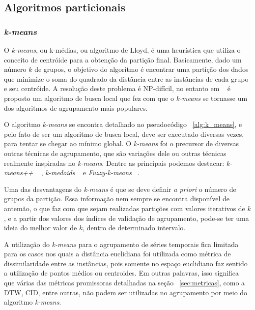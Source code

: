 \subsection{Algoritmos particionais}

\subsubsection{\emph{k-means}}

O \emph{k-means}, ou k-médias, ou algoritmo de Lloyd, é uma heurística que utiliza o conceito de centróide para a obtenção da partição final. Basicamente, dado um número $k$ de grupos, o objetivo do algoritmo é encontrar uma partição dos dados que minimize o soma do quadrado da distância entre as instâncias de cada grupo e seu centróide. A resolução deste problema é NP-difícil, no entanto em ~\parencite{Lloyd} é proposto um algoritmo de busca local que fez com que o \emph{k-means} se tornasse um dos algoritmos de agrupamento mais populares.

O algoritmo \emph{k-means} se encontra detalhado no pseudocódigo ~\ref{alg:k_means}, e pelo fato de ser um algoritmo de busca local, deve ser executado diversas vezes, para tentar se chegar ao mínimo global. O \emph{k-means} foi o precursor de diversas outras técnicas de agrupamento, que são variações dele ou outras técnicas realmente inspiradas no \emph{k-means}. Dentre as principais podemos destacar: \emph{k-means++} ~\parencite{k-means++} , \emph{k-medoids} ~\parencite{k-medoids} e \emph{Fuzzy-k-means } ~\parencite{fuzzy_k-means}.

Uma das desvantagens do \emph{k-means} é que se deve definir \emph{a priori} o número de grupos da partição. Essa informação nem sempre se encontra disponível de antemão, o que faz com que sejam realizadas partições com valores iterativos de $k$, e a partir dos valores dos índices de validação de agrupamento, pode-se ter uma ideia do melhor valor de $k$, dentro de determinado intervalo.

A utilização do \emph{k-means} para o agrupamento de séries temporais fica limitada para os casos nos quais a distância euclidiana foi utilizada como métrica de dissimilaridade entre as instâncias, pois somente no espaço euclidiano faz sentido a utilização de pontos médios ou centroides. Em outras palavras, isso significa que várias das métricas promissoras detalhadas na seção ~\ref{sec:metricas}, como a DTW, CID, entre outras, não podem ser utilizadas no agrupamento por meio do algoritmo \emph{k-means}.


